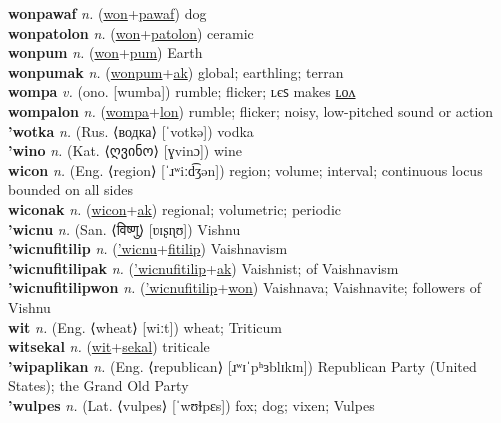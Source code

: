 \textbf{wonpawaf} \textit{n.} (\hyperref[won]{won}+\hyperref[pawaf]{pawaf})
dog \label{wonpawaf} \\
\textbf{wonpatolon} \textit{n.} (\hyperref[won]{won}+\hyperref[patolon]{patolon})
ceramic \label{wonpatolon} \\
\textbf{wonpum} \textit{n.} (\hyperref[won]{won}+\hyperref[pum]{pum})
Earth \label{wonpum} \\
\textbf{wonpumak} \textit{n.} (\hyperref[wonpum]{wonpum}+\hyperref[ak]{ak})
global; earthling; terran \label{wonpumak} \\
\textbf{wompa} \textit{v.} (ono. [wumba])
rumble; flicker; ʟєꜱ makes \hyperref[wompalon]{ʟᴏᴧ} \label{wompa} \\
\textbf{wompalon} \textit{n.} (\hyperref[wompa]{wompa}+\hyperref[lon]{lon})
rumble; flicker; noisy, low-pitched sound or action \label{wompalon} \\
\textbf{'wotka} \textit{n.} (Rus. ⟨водка⟩ [ˈvotkə])
vodka \label{'wotka} \\
\textbf{'wino} \textit{n.} (Kat. ⟨ღვინო⟩ [ɣvinɔ])
wine \label{'wino} \\
\textbf{wicon} \textit{n.} (Eng. ⟨region⟩ [ˈɹʷiːd͡ʒən])
region; volume; interval; continuous locus bounded on all sides \label{wicon} \\
\textbf{wiconak} \textit{n.} (\hyperref[wicon]{wicon}+\hyperref[ak]{ak})
regional; volumetric; periodic \label{wiconak} \\
\textbf{'wicnu} \textit{n.} (San. ⟨विष्णु⟩ [ʋɪʂɳʊ])
Vishnu \label{'wicnu} \\
\textbf{'wicnufitilip} \textit{n.} (\hyperref['wicnu]{'wicnu}+\hyperref[fitilip]{fitilip})
Vaishnavism \label{'wicnufitilip} \\
\textbf{'wicnufitilipak} \textit{n.} (\hyperref['wicnufitilip]{'wicnufitilip}+\hyperref[ak]{ak})
Vaishnist; of Vaishnavism \label{'wicnufitilipak} \\
\textbf{'wicnufitilipwon} \textit{n.} (\hyperref['wicnufitilip]{'wicnufitilip}+\hyperref[won]{won})
Vaishnava; Vaishnavite; followers of Vishnu \label{'wicnufitilipwon} \\
\textbf{wit} \textit{n.} (Eng. ⟨wheat⟩ [wiːt])
wheat; Triticum \label{wit} \\
\textbf{witsekal} \textit{n.} (\hyperref[wit]{wit}+\hyperref[sekal]{sekal})
triticale \label{witsekal} \\
\textbf{'wipaplikan} \textit{n.} (Eng. ⟨republican⟩ [ɹʷɪˈpʰɜblɪkɪn])
Republican Party (United States); the Grand Old Party \label{'wipaplikan} \\
\textbf{'wulpes} \textit{n.} (Lat. ⟨vulpes⟩ [ˈwʊɫpɛs])
fox; dog; vixen; Vulpes \label{'wulpes} \\
